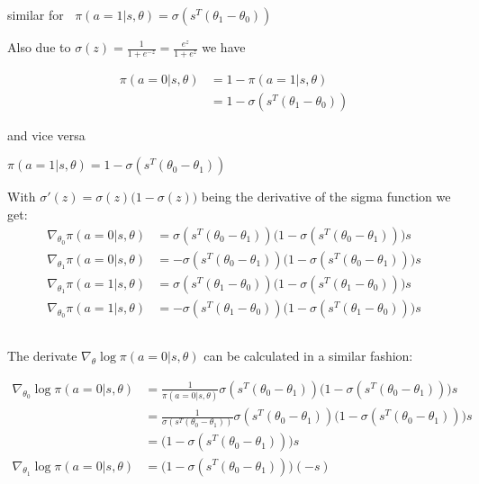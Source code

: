 \documentclass[11pt,a4paper]{article}
\begin{document}
similar for $\;\; \pi(a=1|s,\theta) =  \sigma(s^{T}(\theta_{1} - \theta_{0}))$

\vspace{5pt}

Also due to $\sigma(z) = \frac{1}{1+e^{-z}} = \frac{e^{z}}{1+e^{z}}$ we have

\begin{align*}
  \pi(a=0|s,\theta) &= 1 - \pi(a=1|s,\theta) \\
                    &= 1 - \sigma(s^{T}(\theta_{1} - \theta_{0}))
\end{align*}
  
and vice versa

\begin{center}
  $\pi(a=1|s,\theta) = 1 - \sigma(s^{T}(\theta_{0} - \theta_{1}))$
\end{center}

\vspace{5pt}

With $\sigma'(z) = \sigma(z) \bigl( 1 - \sigma(z) \bigr)$ being the derivative of the sigma function we get: \\

\begin{align*}
  \nabla_{\theta_{0}} \pi(a=0|s,\theta) &= \sigma(s^{T}(\theta_{0} - \theta_{1})) \bigl( 1 -  \sigma(s^{T}(\theta_{0} - \theta_{1})) \bigr)s \\
  \nabla_{\theta_{1}} \pi(a=0|s,\theta) &= -\sigma(s^{T}(\theta_{0} - \theta_{1})) \bigl( 1 -  \sigma(s^{T}(\theta_{0} - \theta_{1})) \bigr)s \\
  \nabla_{\theta_{1}} \pi(a=1|s,\theta) &= \sigma(s^{T}(\theta_{1} - \theta_{0})) \bigl( 1 -  \sigma(s^{T}(\theta_{1} - \theta_{0})) \bigr)s \\
  \nabla_{\theta_{0}} \pi(a=1|s,\theta) &= -\sigma(s^{T}(\theta_{1} - \theta_{0})) \bigl( 1 -  \sigma(s^{T}(\theta_{1} - \theta_{0})) \bigr)s
\end{align*}


\subsection{}

The derivate $\nabla_{\theta} \log \pi(a=0|s,\theta)$ can be calculated in a similar fashion:


\begin{align*}
  \nabla_{\theta_{0}} \log \pi(a=0|s,\theta) &= \frac{1}{\pi(a=0|s,\theta)} 
                  \sigma(s^{T}(\theta_{0} - \theta_{1})) \bigl( 1 -  \sigma(s^{T}(\theta_{0} - \theta_{1})) \bigr)s \\
  &= \frac{1}{\sigma(s^{T}(\theta_{0} - \theta_{1}))} 
  \sigma(s^{T}(\theta_{0} - \theta_{1})) \bigl( 1 -  \sigma(s^{T}(\theta_{0} - \theta_{1})) \bigr)s \\
  &= \bigl( 1 -  \sigma(s^{T}(\theta_{0} - \theta_{1})) \bigr)s \\
  \nabla_{\theta_{1}} \log \pi(a=0|s,\theta) &= \bigl( 1 -  \sigma(s^{T}(\theta_{0} - \theta_{1})) \bigr)(-s)
\end{align*}
\end{document}
